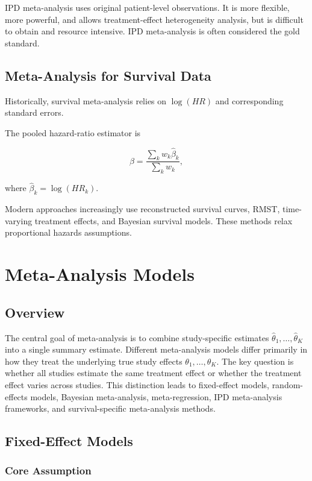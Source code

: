 \documentclass[11pt]{article}
\begin{document}
IPD meta-analysis uses original patient-level observations.
It is more flexible, more powerful, and allows treatment-effect heterogeneity analysis, but is difficult to obtain and resource intensive.
IPD meta-analysis is often considered the gold standard.

\subsection*{Meta-Analysis for Survival Data}

Historically, survival meta-analysis relies on $\log(HR)$ and corresponding standard errors.

The pooled hazard-ratio estimator is

\[\hat{\beta}=\frac{\sum_k w_k\hat{\beta}_k}{\sum_k w_k},\]

where $\hat{\beta}_k=\log(HR_k)$.

Modern approaches increasingly use reconstructed survival curves, RMST, time-varying treatment effects, and Bayesian survival models.
These methods relax proportional hazards assumptions.

\section{Meta-Analysis Models}

\subsection*{Overview}

The central goal of meta-analysis is to combine study-specific estimates $\hat{\theta}_1,\ldots,\hat{\theta}_K$ into a single summary estimate.
Different meta-analysis models differ primarily in how they treat the underlying true study effects $\theta_1,\ldots,\theta_K$.
The key question is whether all studies estimate the same treatment effect or whether the treatment effect varies across studies.
This distinction leads to fixed-effect models, random-effects models, Bayesian meta-analysis, meta-regression, IPD meta-analysis frameworks, and survival-specific meta-analysis methods.

\subsection*{Fixed-Effect Models}

\subsubsection*{Core Assumption}
\end{document}
